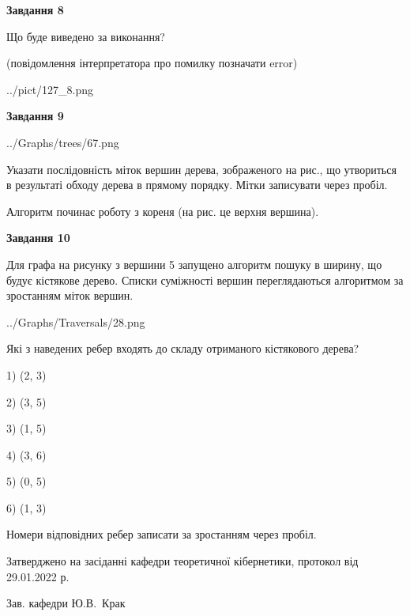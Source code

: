 \documentclass[12pt, ukrainian]{article}
\begin{document}
{\begin {large}
{\begin {center}\textbf{Завдання 8}\end {center}}\par
Що буде виведено за виконання?\par
 (повідомлення інтерпретатора про помилку позначати error)\par
\begin{center}
	{../pict/127_8.png}
\end{center}
\newpage

{\begin {center}\textbf{Завдання 9}\end {center}}\par

\begin{center}
	{../Graphs/trees/67.png}
\end{center}
Указати послідовність міток вершин дерева, зображеного на рис., що утвориться в результаті обходу дерева в прямому порядку. Мітки записувати через пробіл.\par Алгоритм починає роботу з кореня (на рис. це верхня вершина).\par
\newpage

{\begin {center}\textbf{Завдання 10}\end {center}}\par
Для графа на рисунку з вершини 5 запущено алгоритм пошуку в ширину, що будує кістякове дерево. Списки суміжності вершин переглядаються алгоритмом за зростанням міток вершин.\par
\begin{center}
	{../Graphs/Traversals/28.png}
\end{center}
\par Які з наведених ребер входять до складу отриманого кістякового дерева?\par
1) (2, 3)\par
2) (3, 5)\par
3) (1, 5)\par
4) (3, 6)\par
5) (0, 5)\par
6) (1, 3)\par
{\vskip 15pt} Номери відповідних ребер записати за зростанням через пробіл.\par
\newpage


\end {large}
}
{\smallskip \begin {small} Затверджено на засіданні кафедри теоретичної кібернетики, протокол  від   29.01.2022 р.\par\smallskip\smallskip
{\parbox {6.5 cm}{Зав. кафедри \dotfill Ю.В.~Крак}} \end{small}}
\end{document}
